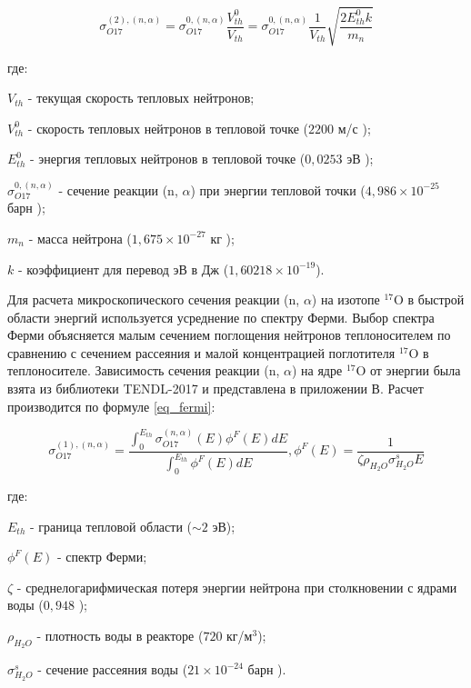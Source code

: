 \begin{equation}
    \label{eq_1_div_V}
    \sigma_{O17}^{(2), (n, \alpha)} = \sigma_{O17}^{0, (n, \alpha)} \frac{V_{th}^0}{V_{th}} = 
        \sigma_{O17}^{0, (n, \alpha)} \frac{1}{V_{th}} \sqrt{\frac{2 E_{th}^{0} k}{m_{n}}}
\end{equation}

где:
\begin{description}
    \item ${V_{th}}$ - текущая скорость тепловых нейтронов;
    \item ${V_{th}^{0}}$ - скорость тепловых нейтронов в тепловой точке ($2200$ м/с \cite{kruchkov_tpn});
    \item $E_{th}^{0}$ - энергия тепловых нейтронов в тепловой точке ($0,0253$ эВ \cite{kruchkov_tpn});
    \item $\sigma_{O17}^{0, (n, \alpha)}$ - сечение реакции (n, $\alpha$) при энергии тепловой точки ($4,986 \times 
        10^{-25}$ барн \cite{janis});
    \item $m_{n}$ - масса нейтрона ($1,675 \times 10^{-27}$ кг \cite{kruchkov_tpn});
    \item $k$ - коэффициент для перевод эВ в Дж ($1,60218 \times 10^{-19}$).
\end{description}

Для расчета микроскопического сечения реакции (n, $\alpha$) на изотопе $^{17}\text{O}$ в быстрой области энергий 
используется усреднение по спектру Ферми. Выбор спектра Ферми объясняется малым сечением поглощения нейтронов 
теплоносителем по сравнению с сечением рассеяния и малой концентрацией поглотителя $^{17}\text{O}$ в теплоносителе. 
Зависимость сечения реакции (n, $\alpha$) на ядре $^{17}\text{O}$ от энергии была взята из библиотеки TENDL-2017 
\cite{janis} и представлена в приложении В. Расчет производится по формуле \ref{eq_fermi}:

\begin{equation}
    \label{eq_fermi}
    \sigma_{O17}^{(1), (n, \alpha)} = \frac
        {\int_{0}^{E_{th}} \sigma_{O17}^{(n, \alpha)}(E) \phi^{F}(E) dE}
        {\int_{0}^{E_{th}} \phi^{F}(E) dE}, \phi^{F}(E) = \frac{1}{\zeta \rho_{H_2O} \sigma_{H_2O}^s E}
\end{equation}

где:
\begin{description}
    \item $E_{th}$ - граница тепловой области ($\sim 2$ эВ);
    \item $\phi^F(E)$ - спектр Ферми;
    \item $\zeta$ - среднелогарифмическая потеря энергии нейтрона при столкновении с ядрами воды ($0,948$ 
        \cite{savander_part1});
    \item $\rho_{H_2O}$ - плотность воды в реакторе ($720$ кг/м$^{3}$);
    \item $\sigma_{H_2O}^s$ - сечение рассеяния воды ($21 \times 10^{-24}$ барн \cite{janis}).
\end{description}

